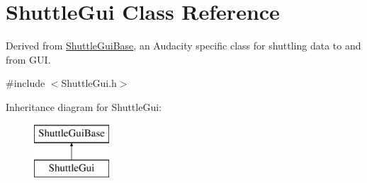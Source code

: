\hypertarget{class_shuttle_gui}{}\section{Shuttle\+Gui Class Reference}
\label{class_shuttle_gui}


Derived from \hyperlink{class_shuttle_gui_base}{Shuttle\+Gui\+Base}, an Audacity specific class for shuttling data to and from G\+UI.  




{\ttfamily \#include $<$Shuttle\+Gui.\+h$>$}

Inheritance diagram for Shuttle\+Gui\+:\begin{figure}[H]
\begin{center}
\leavevmode
\includegraphics[height=2.000000cm]{class_shuttle_gui}
\end{center}
\end{figure}
